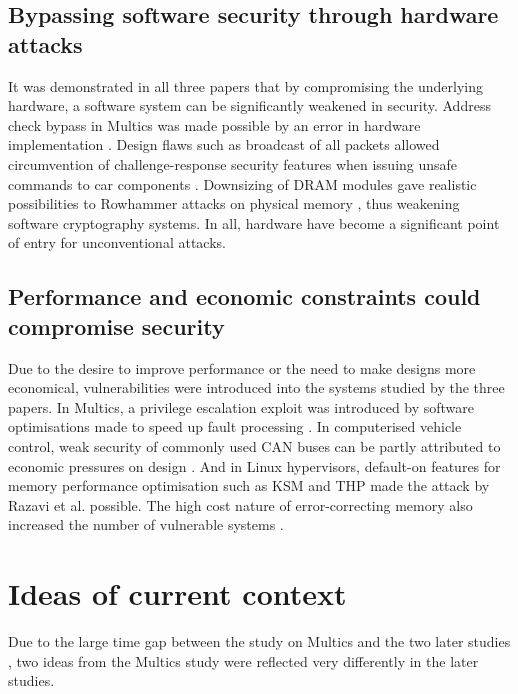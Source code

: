 \documentclass[11pt]{article}
\begin{document}
\subsection{Bypassing software security through hardware attacks}

It was demonstrated in all three papers that by compromising the underlying hardware, a software system can be significantly weakened in security. Address check bypass in Multics was made possible by an error in hardware implementation \cite[3.2.2]{karger1974multics}. Design flaws such as broadcast of all packets allowed circumvention of challenge-response security features when issuing unsafe commands to car components \cite[V. B.]{koscher2010experimental}. Downsizing of DRAM modules gave realistic possibilities to Rowhammer attacks on physical memory \cite[6.2]{razavi2016flip}, thus weakening software cryptography systems. In all, hardware have become a significant point of entry for unconventional attacks.

\subsection{Performance and economic constraints could compromise security}

Due to the desire to improve performance or the need to make designs more economical, vulnerabilities were introduced into the systems studied by the three papers. In Multics, a privilege escalation exploit was introduced by software optimisations made to speed up fault processing \cite[3.3.2]{karger1974multics}. In computerised vehicle control, weak security of commonly used CAN buses can be partly attributed to economic pressures on design \cite[II. A.]{koscher2010experimental}. And in Linux hypervisors, default-on features for memory performance optimisation such as KSM and THP made the attack by Razavi et al. \cite{razavi2016flip} possible. The high cost nature of error-correcting memory also increased the number of vulnerable systems \cite[6.1.1]{razavi2016flip}.

\section{Ideas of current context}

Due to the large time gap between the study on Multics \cite{karger1974multics} and the two later studies \cite{koscher2010experimental}\cite{razavi2016flip}, two ideas from the Multics study were reflected very differently in the later studies.
\end{document}
